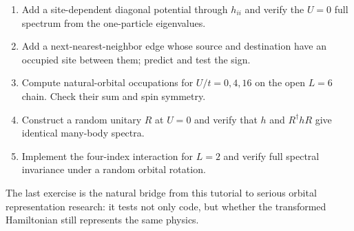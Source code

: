 \begin{enumerate}
\item Add a site-dependent diagonal potential through $h_{ii}$ and verify the
      $U=0$ full spectrum from the one-particle eigenvalues.
\item Add a next-nearest-neighbor edge whose source and destination have an
      occupied site between them; predict and test the sign.
\item Compute natural-orbital occupations for $U/t=0,4,16$ on the open $L=6$
      chain.  Check their sum and spin symmetry.
\item Construct a random unitary $R$ at $U=0$ and verify that $h$ and
      $R^\dagger hR$ give identical many-body spectra.
\item Implement the four-index interaction for $L=2$ and verify full spectral
      invariance under a random orbital rotation.
\end{enumerate}

The last exercise is the natural bridge from this tutorial to serious orbital
representation research: it tests not only code, but whether the transformed
Hamiltonian still represents the same physics.
